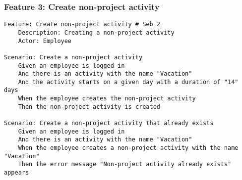 \subsubsection{Feature 3: Create non-project activity} %
\begin{lstlisting}
Feature: Create non-project activity # Seb 2
    Description: Creating a non-project activity
    Actor: Employee

Scenario: Create a non-project activity
    Given an employee is logged in
    And there is an activity with the name "Vacation" 
    And the activity starts on a given day with a duration of "14" days
    When the employee creates the non-project activity
    Then the non-project activity is created

Scenario: Create a non-project activity that already exists
    Given an employee is logged in
    And there is an activity with the name "Vacation"
    When the employee creates a non-project activity with the name "Vacation"
    Then the error message "Non-project activity already exists" appears
\end{lstlisting}

